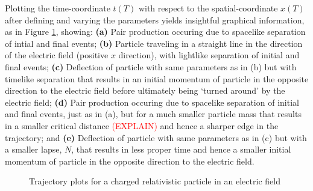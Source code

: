 \documentclass[12pt]{revtex4}
\newcommand{\red}{\textcolor{red}}
\begin{document}
Plotting the time-coordinate $t(T)$ with respect to the spatial-coordinate $x(T)$ after defining and varying the parameters yields insightful graphical information, as in Figure \ref{fig:trajects}, showing: \textbf{(a)} Pair production occuring due to spacelike separation of intial and final events; \textbf{(b)} Particle traveling in a straight line in the direction of the electric field (positive $x$ direction), with lightlike separation of initial and final events; \textbf{(c)} Deflection of particle with same parameters as in (b) but with timelike separation that results in an initial momentum of particle in the opposite direction to the electric field before ultimately being `turned around' by the electric field; \textbf{(d)} Pair production occuring due to spacelike separation of initial and final events, just as in (a), but for a much smaller particle mass that results in a smaller critical distance \red{(EXPLAIN)} and hence a sharper edge in the trajectory; and \textbf{(e)} Deflection of particle with same parameters as in (c) but with a smaller lapse, $N$, that results in less proper time and hence a smaller initial momentum of particle in the opposite direction to the electric field.
\begin{figure}
	\centering
	\caption{Trajectory plots for a charged relativistic particle in an electric field}
	\label{fig:trajects}
\end{figure}
\end{document}
